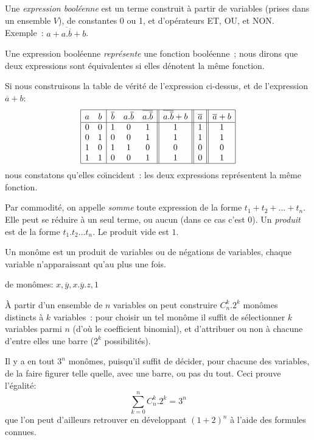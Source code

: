 Une {\em expression bool\'eenne} est un terme construit \`a partir de variables
(prises dans un ensemble $V$), de constantes 0 ou 1, et d'op\'erateurs ET, OU, 
et NON. Exemple~:  $a + \overline{a . \overline{b}} + b$.

Une expression bool\'eenne {\em repr\'esente} une fonction
bool\'eenne~; nous dirons que deux expressions sont \'equivalentes si
elles d\'enotent la m\^eme fonction.

\begin{exemple}{} Si nous construisons la table de v\'erit\'e de l'expression ci-dessus,
et de l'expression $\overline{a}+b$:
$$ \begin{array}{|cc|ccc||c||c||c|}
\hline
a &b & \overline{b}& a.\overline{b}& \overline{a.\overline{b}} & 
  \overline{a.\overline{b}} + b & \overline{a} & \overline{a}+b \\
\hline
0 & 0  & 1 & 0 & 1 & 1 & 1 & 1\\
0 & 1  & 0 & 0 & 1 & 1 & 1 & 1\\
1 & 0  & 1 & 1 & 0 & 0 & 0 & 0\\
1 & 1  & 0 & 0 & 1 & 1 & 0 & 1\\
\hline
\end{array}$$
nous constatons qu'elles co\"{\i}ncident~: les deux expressions repr\'esentent
la m\^eme fonction.
\end{exemple}

Par commodit\'e, on appelle {\em somme} toute expression de la forme 
$t_1 + t_2 + \ldots + t_n$.
Elle peut se r\'eduire \`a un seul terme, ou aucun (dans ce cas c'est 0).
Un {\em produit} est de la forme $t_1.t_2 \ldots t_n$. Le produit vide
est $1$.



Un {mon\^ome} est un produit de variables ou de
n\'egations de variables, chaque variable n'apparaissant qu'au plus une fois.

\begin{exemple}{de mon\^omes: } $x, \overline{y}, x.\overline{y}.z, 1$
\end{exemple}

\begin{remarque}
À partir d'un ensemble de $n$ variables on peut construire $C^k_n.2^k$
mon\^omes distincts \`a $k$ variables~: pour choisir un tel
monôme il suffit de s\'electionner
$k$ variables parmi $n$ (d'o\`u le coefficient binomial), et
d'attribuer ou non \`a chacune d'entre elles une barre ($2^k$
possibilit\'es).


Il y a en tout $3^n$ mon\^omes, puisqu'il suffit de d\'ecider, pour chacune des
variables, de la faire figurer telle quelle, avec une barre, ou pas du tout.
Ceci prouve l'\'egalit\'e:
$$ \sum_{k=0}^n C^k_n.2^k = 3^n$$
que l'on peut d'ailleurs retrouver en d\'eveloppant $(1 + 2)^n$ \`a l'aide des
formules connues.
\end{remarque}

